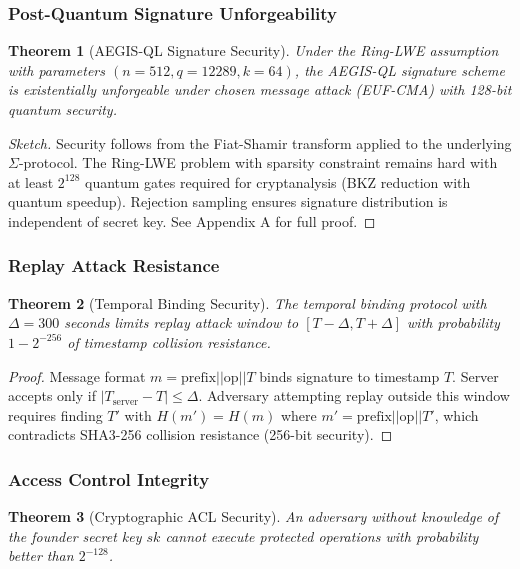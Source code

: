 \documentclass[11pt,a4paper]{article}
\newtheorem{theorem}{Theorem}[section]
\begin{document}
\subsubsection{Post-Quantum Signature Unforgeability}

\begin{theorem}[AEGIS-QL Signature Security]
\label{thm:signature_security}
Under the Ring-LWE assumption with parameters $(n=512, q=12289, k=64)$, the AEGIS-QL signature scheme is existentially unforgeable under chosen message attack (EUF-CMA) with 128-bit quantum security.
\end{theorem}

\begin{proof}[Sketch]
Security follows from the Fiat-Shamir transform applied to the underlying $\Sigma$-protocol. The Ring-LWE problem with sparsity constraint remains hard with at least $2^{128}$ quantum gates required for cryptanalysis (BKZ reduction with quantum speedup). Rejection sampling ensures signature distribution is independent of secret key. See Appendix A for full proof.
\end{proof}

\subsubsection{Replay Attack Resistance}

\begin{theorem}[Temporal Binding Security]
\label{thm:replay_resistance}
The temporal binding protocol with $\Delta = 300$ seconds limits replay attack window to $[T - \Delta, T + \Delta]$ with probability $1 - 2^{-256}$ of timestamp collision resistance.
\end{theorem}

\begin{proof}
Message format $m = \text{prefix} || \text{op} || T$ binds signature to timestamp $T$. Server accepts only if $|T_{\text{server}} - T| \leq \Delta$. Adversary attempting replay outside this window requires finding $T'$ with $H(m') = H(m)$ where $m' = \text{prefix} || \text{op} || T'$, which contradicts SHA3-256 collision resistance (256-bit security).
\end{proof}

\subsubsection{Access Control Integrity}

\begin{theorem}[Cryptographic ACL Security]
\label{thm:acl_security}
An adversary without knowledge of the founder secret key $sk$ cannot execute protected operations with probability better than $2^{-128}$.
\end{theorem}
\end{document}
